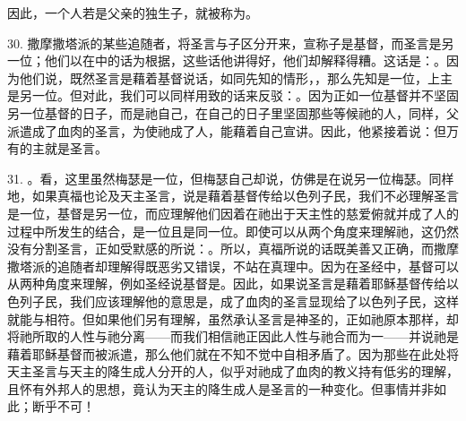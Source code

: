 \par

\par

因此，一个人若是父亲的独生子，就被称为。\par

30. 撒摩撒塔派的某些追随者，将圣言与子区分开来，宣称子是基督，而圣言是另一位；他们以在中的话为根据，这些话他讲得好，他们却解释得糟。这话是：。因为他们说，既然圣言是藉着基督说话，如同先知的情形，，那么先知是一位，上主是另一位。但对此，我们可以同样用致的话来反驳：。因为正如一位基督并不坚固另一位基督的日子，而是祂自己，在自己的日子里坚固那些等候祂的人，同样，父派遣成了血肉的圣言，为使祂成了人，能藉着自己宣讲。因此，他紧接着说：但万有的主就是圣言。\par

31. 。看，这里虽然梅瑟是一位，但梅瑟自己却说，仿佛是在说另一位梅瑟。同样地，如果真福也论及天主圣言，说是藉着基督传给以色列子民，我们不必理解圣言是一位，基督是另一位，而应理解他们因着在祂出于天主性的慈爱俯就并成了人的过程中所发生的结合，是一位且是同一位。即使可以从两个角度来理解祂，这仍然没有分割圣言，正如受默感的所说：。所以，真福所说的话既美善又正确，而撒摩撒塔派的追随者却理解得既恶劣又错误，不站在真理中。因为在圣经中，基督可以从两种角度来理解，例如圣经说基督是。因此，如果说圣言是藉着耶稣基督传给以色列子民，我们应该理解他的意思是，成了血肉的圣言显现给了以色列子民，这样就能与相符。但如果他们另有理解，虽然承认圣言是神圣的，正如祂原本那样，却将祂所取的人性与祂分离——而我们相信祂正因此人性与祂合而为一——并说祂是藉着耶稣基督而被派遣，那么他们就在不知不觉中自相矛盾了。因为那些在此处将天主圣言与天主的降生成人分开的人，似乎对祂成了血肉的教义持有低劣的理解，且怀有外邦人的思想，竟认为天主的降生成人是圣言的一种变化。但事情并非如此；断乎不可！\par

